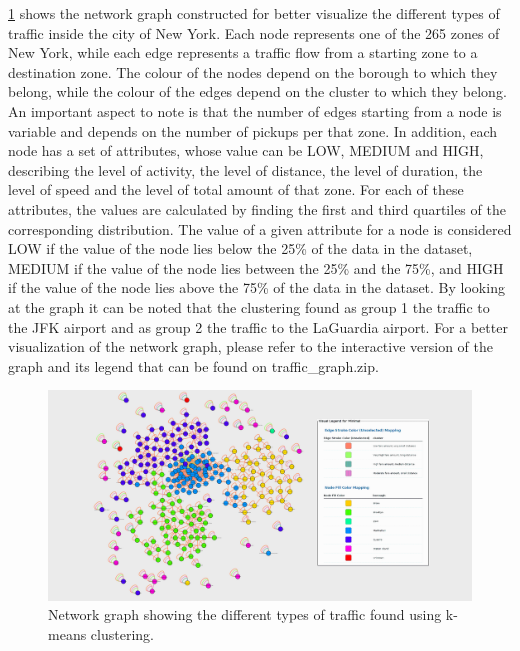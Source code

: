 \documentclass{acm_proc_article-sp-sigmod09}
\begin{document}
\cref{fig:TrafficGraphWithLegend} shows the network graph constructed for better visualize the different types of traffic inside the city of New York. Each node represents one of the 265 zones of New York, while each edge represents a traffic flow from a starting zone to a destination zone. The colour of the nodes depend on the borough to which they belong, while the colour of the edges depend on the cluster to which they belong. An important aspect to note is that the number of edges starting from a node is variable and depends on the number of pickups per that zone. In addition, each node has a set of attributes, whose value can be LOW, MEDIUM and HIGH, describing the level of activity, the level of distance, the level of duration, the level of speed and the level of total amount of that zone. For each of these attributes, the values are calculated by finding the first and third quartiles of the corresponding distribution. The value of a given attribute for a node is considered LOW if the value of the node lies below the 25\% of the data in the dataset, MEDIUM if the value of the node lies between the 25\% and the 75\%, and HIGH if the value of the node lies above the 75\% of the data in the dataset. By looking at the graph it can be noted that the clustering found as group 1 the traffic to the JFK airport and as group 2 the traffic to the LaGuardia airport. For a better visualization of the network graph, please refer to the interactive version of the graph and its legend that can be found on traffic\_graph.zip. 

\begin{figure}
	\centering
	\includegraphics[width=1\columnwidth]{resources/traffic_graph_with_legend.png}
	\caption{Network graph showing the different types of traffic found using k-means clustering.}
	\label{fig:TrafficGraphWithLegend}
\end{figure}
\end{document}
